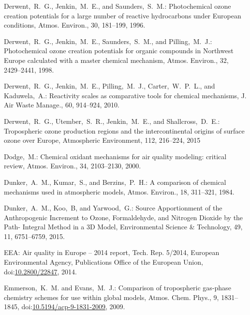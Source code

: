 \documentclass[acpd, online, hvmath]{copernicus}
\begin{document}
\begin{thebibliography}{34}
 Derwent,~R.~G., Jenkin,~M.~E., and
  Saunders,~S.~M.: {Photochemical ozone creation potentials for a
    large number of reactive hydrocarbons under European conditions},
  Atmos. Environ., 30, 181--199, 1996.


 Derwent,~R.~G., Jenkin,~M.~E.,
  Saunders,~S.~M., and Pilling,~M.~J.: {Photochemical ozone creation
    potentials for organic compounds in Northwest Europe calculated
    with a master chemical mechanism}, Atmos. Environ., 32,
  2429--2441, 1998.


 Derwent,~R.~G., Jenkin,~M.~E.,
  Pilling,~M.~J., Carter,~W.~P.~L., and Kaduwela,~A.: {Reactivity
    scales as comparative tools for chemical mechanisms}, J. Air
  Waste Manage., 60, 914--924, 2010.


     Derwent,~R.~G., Utember,~S.~R., Jenkin,~M.~E., and Shallcross,~D.~E.: Tropospheric ozone production regions and the intercontinental origins of surface ozone over Europe, Atmospheric Environment, 112, 216--224, 2015


 Dodge,~M.: {Chemical oxidant
    mechanisms for air quality modeling: critical review},
  Atmos. Environ., 34, 2103--2130, 2000.


  Dunker,~A.~M., Kumar,~S., and Berzins,~P.~H.: {A comparison of
    chemical mechanisms used in atmospheric models}, Atmos. Environ.,
  18, 311--321, 1984.


     Dunker,~A.~M., Koo,~B, and Yarwood,~G.: Source Apportionment of the Anthropogenic Increment to Ozone, Formaldehyde, and Nitrogen Dioxide by the Path- Integral Method in a 3D Model, Environmental Science \& Technology, 49, 11, 6751--6759, 2015.


 EEA: {Air quality in Europe -- 2014
    report}, Tech. Rep. 5/2014, European Environmental Agency, Publications Office of the European
    Union,
  doi:\href{http://dx.doi.org/10.2800/22847}{10.2800/22847}, 2014.


  Emmerson,~K.~M. and Evans,~M.~J.: Comparison of tropospheric
  gas-phase chemistry schemes for use within global models,
  Atmos. Chem. Phys., 9, 1831--1845,
doi:\href{http://dx.doi.org/10.5194/acp-9-1831-2009}{10.5194/acp-9-1831-2009},
  2009.




\end{thebibliography}
\end{document}
